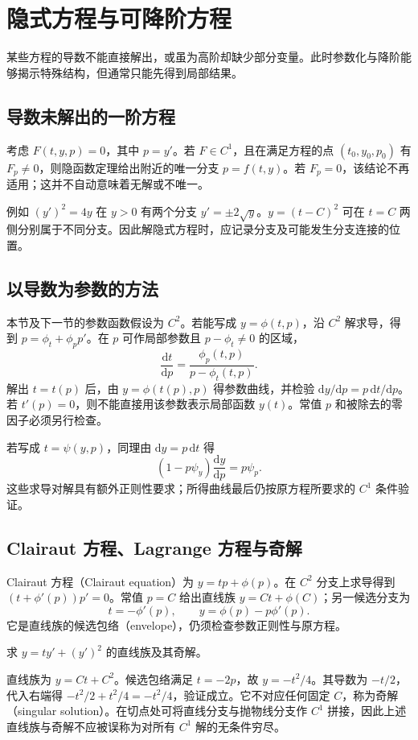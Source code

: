 \setcounter{chapter}{2} %
\chapter{隐式方程与可降阶方程}
\label{chap:ode-reduction}

某些方程的导数不能直接解出，或虽为高阶却缺少部分变量。此时参数化与降阶能够揭示特殊结构，但通常只能先得到局部结果。

\section{导数未解出的一阶方程}
考虑 $F(t,y,p)=0$，其中 $p=y'$。若 $F\in C^1$，且在满足方程的点 $(t_0,y_0,p_0)$ 有 $F_p\ne0$，则隐函数定理给出附近的唯一分支 $p=f(t,y)$。若 $F_p=0$，该结论不再适用；这并不自动意味着无解或不唯一。

例如 $(y')^2=4y$ 在 $y>0$ 有两个分支 $y'=\pm2\sqrt y$。$y=(t-C)^2$ 可在 $t=C$ 两侧分别属于不同分支。因此解隐式方程时，应记录分支及可能发生分支连接的位置。

\section{以导数为参数的方法}
本节及下一节的参数函数假设为 $C^2$。若能写成 $y=\phi(t,p)$，沿 $C^2$ 解求导，得到 $p=\phi_t+\phi_p p'$。在 $p$ 可作局部参数且 $p-\phi_t\ne0$ 的区域，
\[
 \frac{\mathrm dt}{\mathrm dp}=\frac{\phi_p(t,p)}{p-\phi_t(t,p)}.
\]
解出 $t=t(p)$ 后，由 $y=\phi(t(p),p)$ 得参数曲线，并检验 $\mathrm dy/\mathrm dp=p\,\mathrm dt/\mathrm dp$。若 $t'(p)=0$，则不能直接用该参数表示局部函数 $y(t)$。常值 $p$ 和被除去的零因子必须另行检查。

若写成 $t=\psi(y,p)$，同理由 $\mathrm dy=p\,\mathrm dt$ 得
\[
 (1-p\psi_y)\frac{\mathrm dy}{\mathrm dp}=p\psi_p.
\]
这些求导对解具有额外正则性要求；所得曲线最后仍按原方程所要求的 $C^1$ 条件验证。

\section{Clairaut 方程、Lagrange 方程与奇解}
Clairaut 方程（Clairaut equation）为 $y=tp+\phi(p)$。在 $C^2$ 分支上求导得到 $(t+\phi'(p))p'=0$。常值 $p=C$ 给出直线族 $y=Ct+\phi(C)$；另一候选分支为
\[
 t=-\phi'(p),\qquad y=\phi(p)-p\phi'(p).
\]
它是直线族的候选包络（envelope），仍须检查参数正则性与原方程。

\begin{example}[奇解]
求 $y=ty'+(y')^2$ 的直线族及其奇解。
\end{example}
\begin{solve}
直线族为 $y=Ct+C^2$。候选包络满足 $t=-2p$，故 $y=-t^2/4$。其导数为 $-t/2$，代入右端得 $-t^2/2+t^2/4=-t^2/4$，验证成立。它不对应任何固定 $C$，称为奇解（singular solution）。在切点处可将直线分支与抛物线分支作 $C^1$ 拼接，因此上述直线族与奇解不应被误称为对所有 $C^1$ 解的无条件穷尽。
\end{solve}

